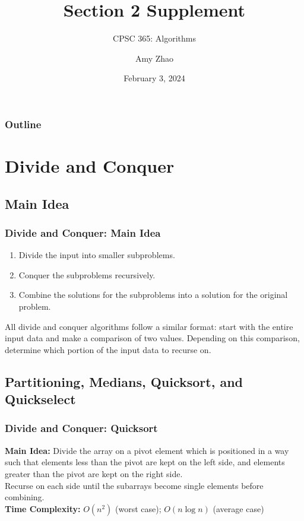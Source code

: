 \documentclass{beamer}
\title{Section 2 Supplement}
\subtitle{CPSC 365: Algorithms}
\author{Amy Zhao}
\date{February 3, 2024}
\begin{document}
\begin{frame}
    \titlepage
\end{frame}

\begin{frame}
    \frametitle{Outline}
    \footnotesize
    \tableofcontents[sections={1}]
\end{frame}

\section{Divide and Conquer}
\subsection{Main Idea}
\begin{frame}
    \frametitle{Divide and Conquer: Main Idea}
    \begin{enumerate}
        \item Divide the input into smaller subproblems. 
        \item Conquer the subproblems recursively. 
        \item Combine the solutions for the subproblems into a solution for the original problem. 
    \end{enumerate}
    All divide and conquer algorithms follow a similar format: start with the entire input data and make a comparison of two values. Depending on this comparison, determine which portion of the input data to recurse on. 
\end{frame}

\subsection{Partitioning, Medians, Quicksort, and Quickselect}
\begin{frame}
    \frametitle{Divide and Conquer: Quicksort}
    \textbf{Main Idea:} Divide the array on a pivot element which is positioned in a way such that elements less than the pivot are kept on the left side, and elements greater than the pivot are kept on the right side. \\[1em]
    Recurse on each side until the subarrays become single elements before combining. \\[1em]
    \textbf{Time Complexity:} $O(n^2)$ (worst case); $O(n\log n)$ (average case)
\end{frame}
\end{document}
